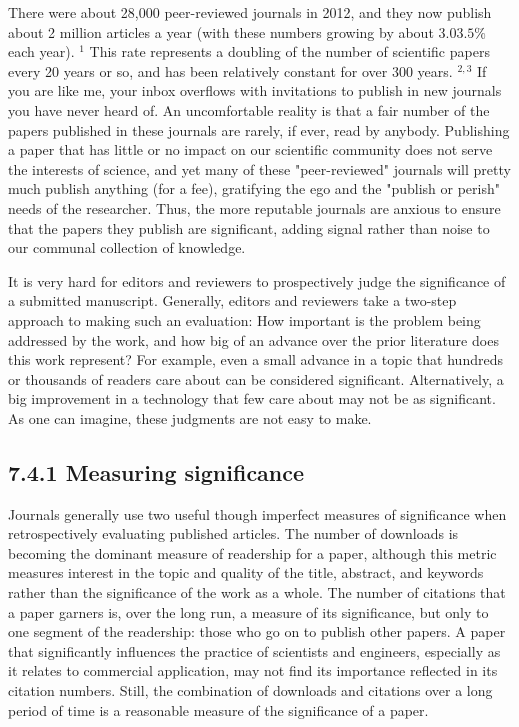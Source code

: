 There were about 28,000 peer-reviewed journals in 2012, and they now publish about 2 million articles a year (with these numbers growing by about 3.0$3.5 \%$ each year). ${ }^{1}$ This rate represents a doubling of the number of scientific papers every 20 years or so, and has been relatively constant for over 300 years. ${ }^{2,3}$ If you are like me, your inbox overflows with invitations to publish in new journals you have never heard of. An uncomfortable reality is that a fair number of the papers published in these journals are rarely, if ever, read by anybody. Publishing a paper that has little or no impact on our scientific community does not serve the interests of science, and yet many of these "peer-reviewed" journals will pretty much publish anything (for a fee), gratifying the ego and the "publish or perish" needs of the researcher. Thus, the more reputable journals are anxious to ensure that the papers they publish are significant, adding signal rather than noise to our communal collection of knowledge.

It is very hard for editors and reviewers to prospectively judge the significance of a submitted manuscript. Generally, editors and reviewers take a two-step approach to making such an evaluation: How important is the problem being addressed by the work, and how big of an advance over the prior literature does this work represent? For example, even a small advance in a topic that hundreds or thousands of readers care about can be considered significant. Alternatively, a big improvement in a technology that few care about may not be as significant. As one can imagine, these judgments are not easy to make.

\subsection*{7.4.1 Measuring significance}
Journals generally use two useful though imperfect measures of significance when retrospectively evaluating published articles. The number of downloads is becoming the dominant measure of readership for a paper, although this metric measures interest in the topic and quality of the title, abstract, and keywords rather than the significance of the work as a whole. The number of citations that a paper garners is, over the long run, a measure of its significance, but only to one segment of the readership: those who go on to publish other papers. A paper that significantly influences the practice of scientists and engineers, especially as it relates to commercial application, may not find its importance reflected in its citation numbers. Still, the combination of downloads and citations over a long period of time is a reasonable measure of the significance of a paper.


